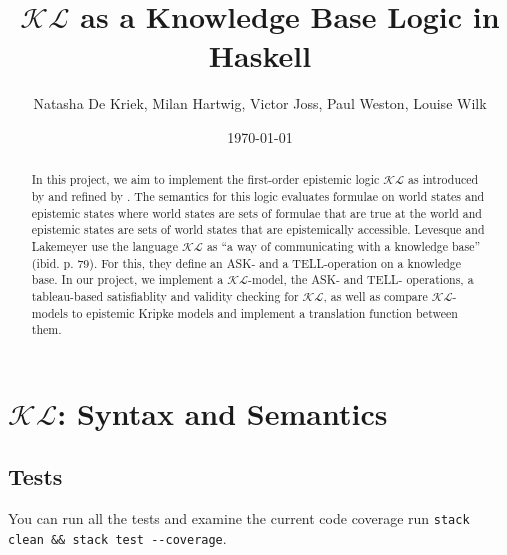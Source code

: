 \documentclass[12pt,a4paper]{article}
\title{$\mathcal{KL}$ as a Knowledge Base Logic in Haskell}
\author{Natasha De Kriek, Milan Hartwig, Victor Joss, Paul Weston, Louise Wilk}
\date{\today}
\begin{document}
\maketitle

\begin{abstract}
In this project, we aim to implement the first-order epistemic logic $\mathcal{KL}$ as introduced by \textcite{levesque1981} and refined by \textcite{Lokb}. 
The semantics for this logic evaluates formulae on world states and epistemic states where world states are sets of formulae that are true at the world and epistemic states are sets of world states that are epistemically accessible. Levesque and Lakemeyer use the language $\mathcal{KL}$ as ``a way of communicating with a knowledge base'' (ibid. p. 79). For this, they define an ASK- and a TELL-operation on a knowledge base. In our project, we implement a  $\mathcal{KL}$-model, the ASK- and TELL- operations, a tableau-based satisfiablity and validity checking for  $\mathcal{KL}$, as well as compare  $\mathcal{KL}$-models to epistemic Kripke models and implement a translation function between them.
\end{abstract}


\tableofcontents

\clearpage



\section{\texorpdfstring{$\mathcal{KL}$}{KL}: Syntax and Semantics}\label{sec:KLmodel}








% 



\subsection{Tests}
You can run all the tests and examine the current code coverage run \verb|stack clean && stack test --coverage|.








%

% 

\printbibliography
\end{document}
